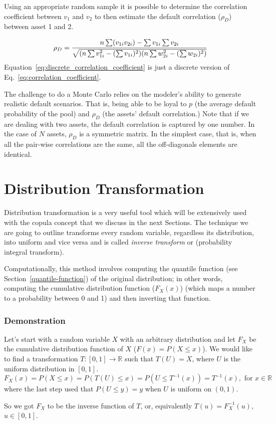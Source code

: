 Using an appropriate random sample it is possible to determine the correlation coefficient between $v_1$ and $v_2$ to then estimate the default correlation ($\rho_D$) between asset 1 and 2.

\begin{equation}
\rho_D = \cfrac{n\sum (v_{1i} v_{2i}) - \sum v_{1i} \sum v_{2i}}{\sqrt{(n\sum v_{1i}^2 - (\sum v_{1i})^2)(n\sum w_{2i}^2 - (\sum w_{2i})^2)}}
\label{eq:discrete_correlation_coefficient}
\end{equation}
Equation~\ref{eq:discrete_correlation_coefficient} is just a discrete version of Eq.~\ref{eq:correlation_coefficient}.

The challenge to do a Monte Carlo relies on the modeler’s ability to generate
realistic default scenarios. That is, being able to be loyal to $p$ (the average
default probability of the pool) and $\rho_D$ (the assets’ default correlation.) Note that if we are dealing with two assets, the default correlation is captured by one number. In the case of $N$ assets, $\rho_D$ is a symmetric matrix. In the
simplest case, that is, when all the pair-wise correlations are the same, all the
off-diagonals elements are identical. 

\section{Distribution Transformation}
\label{distribution-transformation}

Distribution transformation is a very useful tool which will be
extensively used with the copula concept that we discuss in the next
Sections. The technique we are going to outline transforms every random
variable, regardless its distribution, into uniform and vice versa and is called
\emph{inverse transform} or (probability integral transform).

Computationally, this method involves computing the quantile function 
(see Section~\ref{quantile-function}) of
the original distribution; in other words, computing the cumulative
distribution function ($F_X(x)$) (which maps a number
to a probability between 0 and 1) and then inverting that
function. 

\begin{attention}
\subsubsection{Demonstration}
Let's start with a random variable $X$ with an arbitrary distribution and let $F_X$ be the 
cumulative distribution function of $X$ (\(F(x) = P(X \leq x)\)).
We would like to find a transformation $T:[0,1]\rightarrow\mathbb{R}$ such that $T(U)=X$, where
$U$ is the uniform distribution in $[0,1]$. 
\begin{equation*}
F_{X}(x)= P(X\leq x)=P(T(U)\leq x)= P(U\leq T^{-1}(x))=T^{-1}(x),{\text{ for }}x\in \mathbb {R}
\end{equation*}
where the last step used that $P(U\leq y)=y$ when $U$ is uniform on $(0,1)$.

So we got $F_{X}$ to be the inverse function of $T$, or, equivalently $T(u)=F_{X}^{-1}(u)$, $u\in [0,1]$.
\end{attention}

